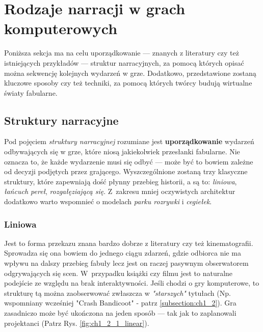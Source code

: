 \graphicspath{{chapters/chapter2/imgs/}}

\chapter{Rodzaje narracji w grach komputerowych}\label{chapter:ch2}

Poniższa sekcja ma na celu uporządkowanie --- znanych z literatury czy też istniejących
przykładów --- struktur narracyjnych, za pomocą których opisać można sekwencję kolejnych
wydarzeń w grze. Dodatkowo, przedstawione zostaną kluczowe sposoby czy też techniki, za
pomocą których twórcy budują wirtualne światy fabularne.

\section{Struktury narracyjne}\label{subsection:ch1_2_1}

Pod pojęciem \textit{struktury narracyjnej} rozumiane jest \textbf{uporządkowanie}
wydarzeń odbywających się w grze, które niosą jakiekolwiek przesłanki fabularne.
Nie oznacza to, że każde wydarzenie musi się odbyć --- może być to bowiem zależne od
decyzji podjętych przez grającego. Wyszczególnione zostaną trzy klasyczne struktury,
które zapewniają dość płynny przebieg historii, a są to: \textit{liniowa}, \textit{łańcuch pereł},
\textit{rozgałęziającą się}\cite{the_evolution_of_video_games}\cite{theorising_narrative}\cite{narrative_structures}.
Z~zakresu mniej oczywistych architektur dodatkowo warto wspomnieć o modelach
\textit{parku rozrywki} i \textit{cegiełek}\cite{theorising_narrative}.

\subsection{Liniowa}

Jest to forma przekazu znana bardzo dobrze z literatury czy też kinematografii. Sprowadza się ona
bowiem do jednego ciągu zdarzeń, gdzie odbiorca nie ma wpływu na dalszy przebieg fabuły lecz jest
on raczej pasywnym obserwatorem odgrywających się scen. W~przypadku książki czy filmu jest to
naturalne podejście ze względu na brak interaktywności. Jeśli chodzi o gry komputerowe, to
strukturę tą można zaobserwować zwłaszcza w \textit{"starszych"} tytułach (Np. wspomniany wcześniej
"Crash Bandicoot" - patrz \ref{subsection:ch1_2}). Gra zasadniczo może być ukończona na jeden
sposób --- tak jak to zaplanowali projektanci\cite{the_evolution_of_video_games} (Patrz Rys. \ref{fig:ch1_2_1_linear}).

